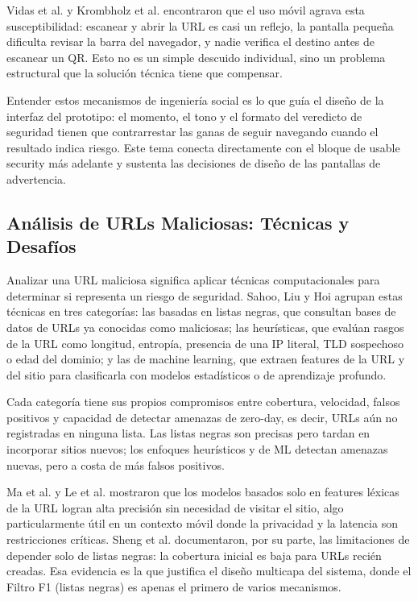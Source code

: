 Vidas et al. \cite{vidas2013qrishing} y Krombholz et al. \cite{krombholz2014qr} encontraron que el uso m\'ovil agrava esta susceptibilidad: escanear y abrir la URL es casi un reflejo, la pantalla peque\~na dificulta revisar la barra del navegador, y nadie verifica el destino antes de escanear un QR. Esto no es un simple descuido individual, sino un problema estructural que la soluci\'on t\'ecnica tiene que compensar.

Entender estos mecanismos de ingenier\'ia social es lo que gu\'ia el dise\~no de la interfaz del prototipo: el momento, el tono y el formato del veredicto de seguridad tienen que contrarrestar las ganas de seguir navegando cuando el resultado indica riesgo. Este tema conecta directamente con el bloque de usable security m\'as adelante y sustenta las decisiones de dise\~no de las pantallas de advertencia.

\subsection{An\'alisis de URLs Maliciosas: T\'ecnicas y Desaf\'ios}

Analizar una URL maliciosa significa aplicar t\'ecnicas computacionales para determinar si representa un riesgo de seguridad. Sahoo, Liu y Hoi \cite{sahoo2017malicious} agrupan estas t\'ecnicas en tres categor\'ias: las basadas en listas negras, que consultan bases de datos de URLs ya conocidas como maliciosas; las heur\'isticas, que eval\'uan rasgos de la URL como longitud, entrop\'ia, presencia de una IP literal, TLD sospechoso o edad del dominio; y las de machine learning, que extraen features de la URL y del sitio para clasificarla con modelos estad\'isticos o de aprendizaje profundo.

Cada categor\'ia tiene sus propios compromisos entre cobertura, velocidad, falsos positivos y capacidad de detectar amenazas de zero-day, es decir, URLs a\'un no registradas en ninguna lista. Las listas negras son precisas pero tardan en incorporar sitios nuevos; los enfoques heur\'isticos y de ML detectan amenazas nuevas, pero a costa de m\'as falsos positivos.

Ma et al. \cite{ma2009beyond} y Le et al. \cite{le2011phishdef} mostraron que los modelos basados solo en features l\'exicas de la URL logran alta precisi\'on sin necesidad de visitar el sitio, algo particularmente \'util en un contexto m\'ovil donde la privacidad y la latencia son restricciones cr\'iticas. Sheng et al. \cite{sheng2009empirical} documentaron, por su parte, las limitaciones de depender solo de listas negras: la cobertura inicial es baja para URLs reci\'en creadas. Esa evidencia es la que justifica el dise\~no multicapa del sistema, donde el Filtro F1 (listas negras) es apenas el primero de varios mecanismos.

